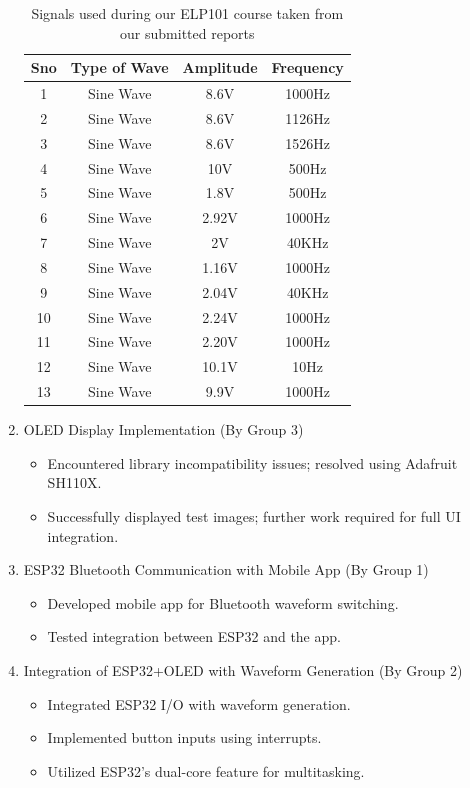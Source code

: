 \documentclass[12pt,a4paper]{article}
\begin{document}
\begin{enumerate}
\begin{table}[h!]
\centering
\begin{tabular}{|c|c|c|c|}
\hline
\textbf{Sno} & \textbf{Type of Wave} & \textbf{Amplitude} & \textbf{Frequency} \\
\hline
1 & Sine Wave & 8.6V & 1000Hz \\
2 & Sine Wave & 8.6V & 1126Hz \\
3 & Sine Wave & 8.6V & 1526Hz \\
4 & Sine Wave & 10V & 500Hz \\
5 & Sine Wave & 1.8V & 500Hz \\
6 & Sine Wave & 2.92V & 1000Hz \\
7 & Sine Wave & 2V & 40KHz \\
8 & Sine Wave & 1.16V & 1000Hz \\
9 & Sine Wave & 2.04V & 40KHz \\
10 & Sine Wave & 2.24V & 1000Hz \\
11 & Sine Wave & 2.20V & 1000Hz \\
12 & Sine Wave & 10.1V & 10Hz \\
13 & Sine Wave & 9.9V & 1000Hz \\
\hline
\end{tabular}
\caption{Signals used during our ELP101 course taken from our submitted reports}
\end{table}

    \item OLED Display Implementation (By Group 3)
    \begin{itemize}
        \item Encountered library incompatibility issues; resolved using Adafruit SH110X.
        \item Successfully displayed test images; further work required for full UI integration.
    \end{itemize}
    \item ESP32 Bluetooth Communication with Mobile App (By Group 1)
    \begin{itemize}
        \item Developed mobile app for Bluetooth waveform switching.
        \item Tested integration between ESP32 and the app.
    \end{itemize}
    \item Integration of ESP32+OLED with Waveform Generation (By Group 2)
    \begin{itemize}
        \item Integrated ESP32 I/O with waveform generation.
        \item Implemented button inputs using interrupts.
        \item Utilized ESP32's dual-core feature for multitasking.
    \end{itemize}

\end{enumerate}
\end{document}

